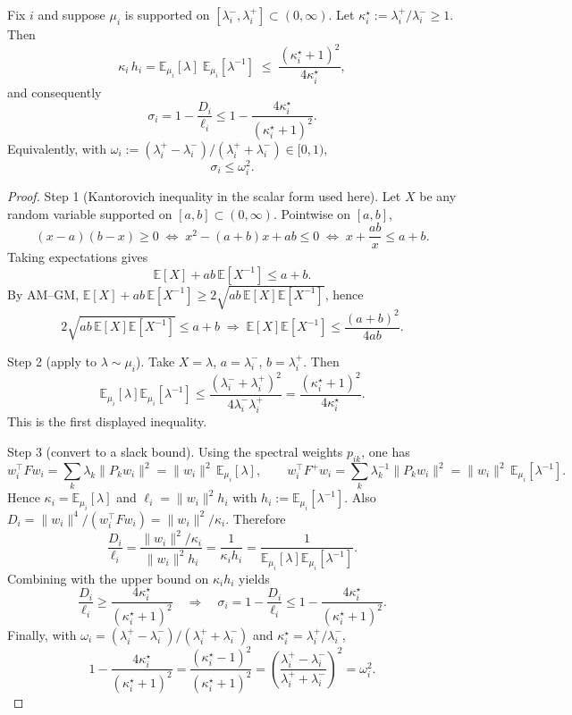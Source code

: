 \documentclass[10pt,a4paper]{amsart}
\begin{document}
\begin{theorem}\label{thm:kantorovich-band}
Fix $i$ and suppose $\mu_i$ is supported on $[\lambda_i^{-},\lambda_i^{+}]\subset(0,\infty)$.
Let $\kappa_i^\star:=\lambda_i^{+}/\lambda_i^{-}\ge 1$.
Then
\[
\kappa_i\,h_i
=
\mathbb{E}_{\mu_i}[\lambda]\;\mathbb{E}_{\mu_i}[\lambda^{-1}]
\;\le\;
\frac{(\kappa_i^{\star}+1)^2}{4\kappa_i^{\star}},
\]
and consequently
\[
\sigma_i
=
1-\frac{D_i}{\ell_i}
\le
1-\frac{4\kappa_i^{\star}}{(\kappa_i^{\star}+1)^2}.
\]
Equivalently, with $\omega_i := (\lambda_i^{+}-\lambda_i^{-})/(\lambda_i^{+}+\lambda_i^{-})\in[0,1)$,
\[
\sigma_i \le \omega_i^2.
\]
\end{theorem}

\begin{proof}
Step 1 (Kantorovich inequality in the scalar form used here).
Let $X$ be any random variable supported on $[a,b]\subset(0,\infty)$. Pointwise on $[a,b]$,
\[
(x-a)(b-x)\ge 0
\;\Longleftrightarrow\;
x^2-(a+b)x+ab\le 0
\;\Longleftrightarrow\;
x+\frac{ab}{x}\le a+b.
\]
Taking expectations gives
\[
\mathbb{E}[X] + ab\,\mathbb{E}[X^{-1}] \le a+b.
\]
By AM--GM, $\mathbb{E}[X] + ab\,\mathbb{E}[X^{-1}] \ge 2\sqrt{ab\,\mathbb{E}[X]\mathbb{E}[X^{-1}]}$, hence
\[
2\sqrt{ab\,\mathbb{E}[X]\mathbb{E}[X^{-1}]}\le a+b
\;\Longrightarrow\;
\mathbb{E}[X]\mathbb{E}[X^{-1}] \le \frac{(a+b)^2}{4ab}.
\]

Step 2 (apply to $\lambda\sim\mu_i$).
Take $X=\lambda$, $a=\lambda_i^-$, $b=\lambda_i^+$. Then
\[
\mathbb{E}_{\mu_i}[\lambda]\mathbb{E}_{\mu_i}[\lambda^{-1}]
\le
\frac{(\lambda_i^-+\lambda_i^+)^2}{4\lambda_i^-\lambda_i^+}
=
\frac{(\kappa_i^\star+1)^2}{4\kappa_i^\star}.
\]
This is the first displayed inequality.

Step 3 (convert to a slack bound).
Using the spectral weights $p_{ik}$, one has
\[
w_i^\top F w_i = \sum_k \lambda_k \|P_k w_i\|^2 = \|w_i\|^2\,\mathbb{E}_{\mu_i}[\lambda],
\qquad
w_i^\top F^+ w_i = \sum_k \lambda_k^{-1} \|P_k w_i\|^2 = \|w_i\|^2\,\mathbb{E}_{\mu_i}[\lambda^{-1}].
\]
Hence $\kappa_i=\mathbb{E}_{\mu_i}[\lambda]$ and $\ell_i=\|w_i\|^2 h_i$ with $h_i:=\mathbb{E}_{\mu_i}[\lambda^{-1}]$.
Also $D_i = \|w_i\|^4/(w_i^\top F w_i) = \|w_i\|^2/\kappa_i$. Therefore
\[
\frac{D_i}{\ell_i}
=
\frac{\|w_i\|^2/\kappa_i}{\|w_i\|^2 h_i}
=
\frac{1}{\kappa_i h_i}
=
\frac{1}{\mathbb{E}_{\mu_i}[\lambda]\mathbb{E}_{\mu_i}[\lambda^{-1}]}.
\]
Combining with the upper bound on $\kappa_i h_i$ yields
\[
\frac{D_i}{\ell_i}
\ge
\frac{4\kappa_i^\star}{(\kappa_i^\star+1)^2}
\quad\Longrightarrow\quad
\sigma_i = 1-\frac{D_i}{\ell_i}
\le
1-\frac{4\kappa_i^\star}{(\kappa_i^\star+1)^2}.
\]
Finally, with $\omega_i=(\lambda_i^+-\lambda_i^-)/(\lambda_i^++\lambda_i^-)$ and $\kappa_i^\star=\lambda_i^+/\lambda_i^-$,
\[
1-\frac{4\kappa_i^\star}{(\kappa_i^\star+1)^2}
=
\frac{(\kappa_i^\star-1)^2}{(\kappa_i^\star+1)^2}
=
\left(\frac{\lambda_i^+-\lambda_i^-}{\lambda_i^++\lambda_i^-}\right)^2
=
\omega_i^2.
\]
\end{proof}
\end{document}
